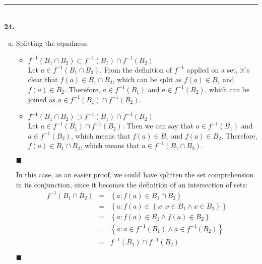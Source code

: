 \documentclass{article}[10pt]
\newenvironment{exercise}[1]
    {\noindent\rule{2cm}{0.4pt} \\
     \textbf{#1.}}
    {}
\newcommand{\qed}{

\hfill\ensuremath{\blacksquare}

}
\begin{document}
\begin{exercise}{24}
\begin{enumerate}[(a)]
    \item
      Splitting the equalness:
      \begin{itemize}
        \item $f^{-1}(B_1 \cap B_2) \subset
               f^{-1}(B_1) \cap f^{-1}(B_2)$ \\
          Let $a \in f^{-1}(B_1 \cap B_2)$.
          From the definition of $f^{-1}$ applied on a set,
          it's clear that $f(a) \in B_1 \cap B_2$,
          which can be split as $f(a) \in B_1$ and $f(a) \in B_2$.
          Therefore, $a \in f^{-1}(B_1)$ and $a \in f^{-1}(B_2)$,
          which can be joined as
          $a \in f^{-1}(B_1) \cap f^{-1}(B_2)$.
        \item $f^{-1}(B_1 \cap B_2) \supset
               f^{-1}(B_1) \cap f^{-1}(B_2)$ \\
          Let $a \in f^{-1}(B_1) \cap f^{-1}(B_2)$.
          Then we can say that
          $a \in f^{-1}(B_1)$ and $a \in f^{-1}(B_2)$,
          which means that
          $f(a) \in B_1$ and $f(a) \in B_2$.
          Therefore, $f(a) \in B_1 \cap B_2$,
          which means that $a \in f^{-1}(B_1 \cap B_2)$.
      \end{itemize}
      \qed
      In this case, as an easier proof,
      we could have splitten the set comprehension in its conjunction,
      since it becomes the definition of an intersection of sets:
      \[\begin{array}{rcl}
        f^{-1}(B_1 \cap B_2)
        &=& \left\{ a : f(a) \in B_1 \cap B_2 \right\} \\
        &=& \left\{ a : f(a) \in \left\{ x : x \in B_1 \land x \in B_2
                                 \right\}
            \right\} \\
        &=& \left\{ a : f(a) \in B_1 \land f(a) \in B_2 \right\} \\
        &=& \left\{ a : a \in f^{-1}(B_1) \land
                        a \in f^{-1}(B_2) \right\} \\
        &=& f^{-1}(B_1) \cap f^{-1}(B_2)
      \end{array}\]
      \qed


\end{enumerate}
\end{exercise}
\end{document}

